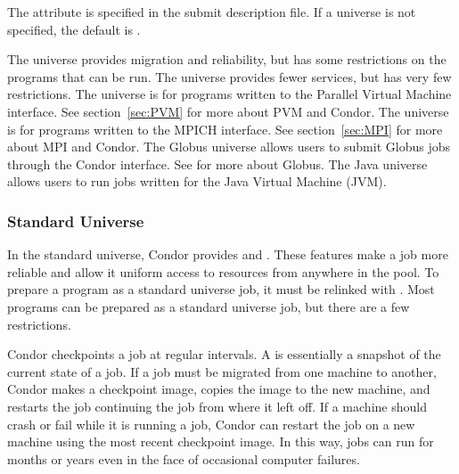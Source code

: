 The  attribute is specified in the submit description file.
If a universe is not specified, the default is .

The  universe provides migration and reliability, but has some
restrictions on the programs that can be run. 
The  universe provides fewer services, but has very few
restrictions.
The  universe is for programs written to the Parallel Virtual
Machine interface.  See section~\ref{sec:PVM} for more about PVM and Condor.
The  universe is for programs written to the MPICH interface.
See section~\ref{sec:MPI} for more about MPI and Condor.
The Globus universe allows users to submit Globus jobs through the
Condor interface.  See  for more about Globus.
The Java universe allows users to run jobs written for the
Java Virtual Machine (JVM).

\subsubsection{\label{sec:standard-universe}Standard Universe}

In the standard universe, Condor provides  and
.  These features make a job more reliable
and allow it uniform access to resources from anywhere in the pool.
To prepare a program as a standard universe job, it must be relinked
with .  Most programs can be prepared as a standard
universe job, but there are a few restrictions.

Condor checkpoints a job at regular intervals.
A  is essentially a snapshot of the current
state of a job. 
If a job must be migrated from one machine to another,
Condor makes a checkpoint image, copies the image to the new machine,
and restarts the job continuing the job from where it left off.
If a machine should
crash or fail while it is running a job, Condor can restart the job on
a new machine using the most recent checkpoint image.
In this way, jobs
can run for months or years even in the face of occasional computer failures.

